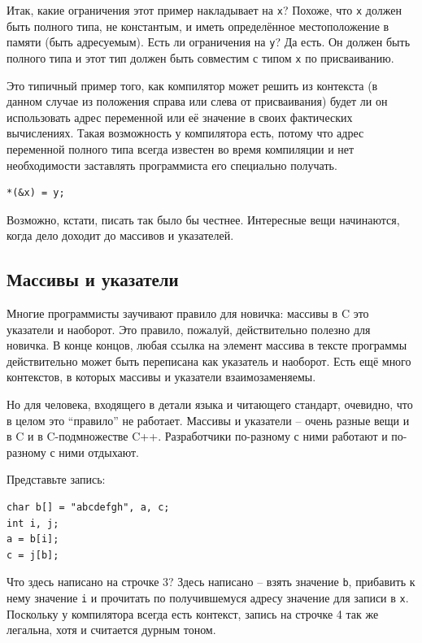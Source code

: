 \documentclass[a4paper,12pt,oneside]{article}
\begin{document}
Итак, какие ограничения этот пример накладывает на \lstinline!x!? Похоже, что \lstinline!x! должен быть полного типа, не константым, и иметь определённое местоположение в памяти (быть адресуемым). Есть ли ограничения на \lstinline!y!? Да есть. Он должен быть полного типа и этот тип должен быть совместим с типом \lstinline!x! по присваиванию.  

Это типичный пример того, как компилятор может решить из контекста (в данном случае из положения справа или слева от присваивания) будет ли он использовать адрес переменной или её значение в своих фактических вычислениях. Такая возможность у компилятора есть, потому что адрес переменной полного типа всегда известен во время компиляции и нет необходимости заставлять программиста его специально получать.

\begin{lstlisting}
*(&x) = y;
\end{lstlisting}

Возможно, кстати, писать так было бы честнее. Интересные вещи начинаются, когда дело доходит до массивов и указателей.

\pagebreak
\subsection{Массивы и указатели}

Многие программисты заучивают правило для новичка: массивы в C это указатели и наоборот. Это правило, пожалуй, действительно полезно для новичка. В конце концов, любая ссылка на элемент массива в тексте программы действительно может быть переписана как указатель и наоборот. Есть ещё много контекстов, в которых массивы и указатели взаимозаменяемы.

Но для человека, входящего в детали языка и читающего стандарт, очевидно, что в целом это ``правило'' не работает. Массивы и указатели – очень разные вещи и в C и в C-подмножестве C++. Разработчики по-разному с ними работают и по-разному с ними отдыхают.

Представьте запись:

\begin{lstlisting}
char b[] = "abcdefgh", a, c;
int i, j;
a = b[i];
c = j[b];
\end{lstlisting}

Что здесь написано на строчке 3? Здесь написано – взять значение \lstinline!b!, прибавить к нему значение \lstinline!i! и прочитать по получившемуся адресу значение для записи в \lstinline!x!. Поскольку у компилятора всегда есть контекст, запись на строчке 4 так же легальна, хотя и считается дурным тоном.
\end{document}
